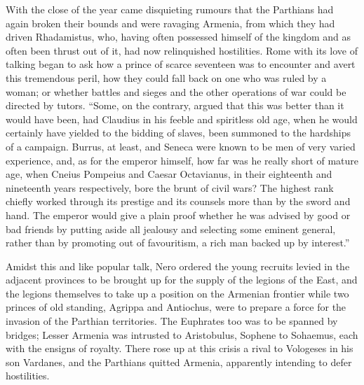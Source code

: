With the close of the year came disquieting rumours that the Parthians had again broken their bounds and were ravaging Armenia, from which they had driven Rhadamistus, who, having often possessed himself of the kingdom and as often been thrust out of it, had now relinquished hostilities. Rome with its love of talking began to ask how a prince of scarce seventeen was to encounter and avert this tremendous peril, how they could fall back on one who was ruled by a woman; or whether battles and sieges and the other operations of war could be directed by tutors. ``Some, on the contrary, argued that this was better than it would have been, had Claudius in his feeble and spiritless old age, when he would certainly have yielded to the bidding of slaves, been summoned to the hardships of a campaign. Burrus, at least, and Seneca were known to be men of very varied experience, and, as for the emperor himself, how far was he really short of mature age, when Cneius Pompeius and Caesar Octavianus, in their eighteenth and nineteenth years respectively, bore the brunt of civil wars? The highest rank chiefly worked through its prestige and its counsels more than by the sword and hand. The emperor would give a plain proof whether he was advised by good or bad friends by putting aside all jealousy and selecting some eminent general, rather than by promoting out of favouritism, a rich man backed up by interest.''


Amidst this and like popular talk, Nero ordered the young recruits levied in the adjacent provinces to be brought up for the supply of the legions of the East, and the legions themselves to take up a position on the Armenian frontier while two princes of old standing, Agrippa and Antiochus, were to prepare a force for the invasion of the Parthian territories. The Euphrates too was to be spanned by bridges; Lesser Armenia was intrusted to Aristobulus, Sophene to Sohaemus, each with the ensigns of royalty. There rose up at this crisis a rival to Vologeses in his son Vardanes, and the Parthians quitted Armenia, apparently intending to defer hostilities.


